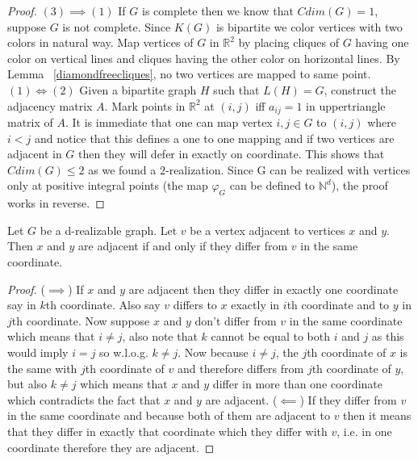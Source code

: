 \documentclass[12pt,a4paper,titlepage,openany]{report}
\begin{document}
\begin{proof}
$(3)\implies (1)$ If $G$ is complete then we know that $Cdim(G)=1$, suppose $G$ is not complete. Since $K(G)$ is bipartite we color vertices with two colors in natural way. Map vertices of $G$ in $\mathbb{R}^2$ by placing cliques of $G$ having one color on vertical lines and cliques having the other color on horizontal lines. By Lemma ~\ref{diamondfreecliques}, no two vertices are mapped to same point.
\newline
$(1)\iff (2)$ Given a bipartite graph $H$ such that $L(H)=G$, construct the adjacency matrix $A$. Mark points in $\mathbb{R}^2$ at $(i, j)$ iff $a_{ij} = 1$ in uppertriangle matrix of $A$. It is immediate that one can map vertex ${i,j}\in G$ to $(i,j)$ where $i<j$ and notice that this defines a one to one mapping and if two vertices are adjacent in $G$ then they will defer in exactly on coordinate. This shows that $Cdim(G)\leq 2$ as we found a $2$-realization.\newline
Since G can be realized with vertices only at positive integral points (the map $\varphi_G$ can be defined to $\mathbb{N}^d$), the proof works in reverse.
\end{proof}

\begin{lemma}\label{xyv adjacent}
Let $G$ be a d-realizable graph. Let $v$ be a vertex adjacent to vertices $x$ and $y$. Then $x$ and $y$ are adjacent if and only if they differ from $v$ in the same coordinate.
\end{lemma}
\begin{proof}
($\implies$) If $x$ and $y$ are adjacent then they differ in exactly one coordinate say in $k$th coordinate. Also say $v$ differs to $x$ exactly in $i$th coordinate and to $y$ in $j$th coordinate. Now suppose $x$ and $y$ don't differ from $v$ in the same coordinate which means that $i\neq j$, also note that $k$ cannot be equal to both $i$ and $j$ as this would imply $i=j$ so w.l.o.g. $k\neq j$. Now because $i\neq j$, the $j$th coordinate of $x$ is the same with $j$th coordinate of $v$ and therefore differs from $j$th coordinate of $y$, but also $k\neq j$ which means that $x$ and $y$ differ in more than one coordinate which contradicts the fact that $x$ and $y$ are adjacent.\newline
($\impliedby$) If they differ from $v$ in the same coordinate and because both of them are adjacent to $v$ then it means that they differ in exactly that coordinate which they differ with $v$, i.e. in one coordinate therefore they are adjacent.
\end{proof}
\end{document}
